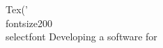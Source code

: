 \documentclass[preview]{standalone}
\begin{document}
\begin{flushleft}
Tex('\\fontsize{20}{0}\\selectfont Developing a software for
\end{flushleft}
\end{document}
